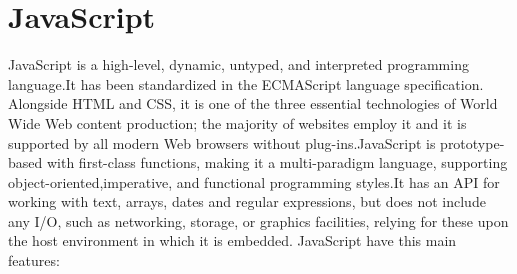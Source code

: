 \documentclass[a4paper, 12pt]{book}
\begin{document}
\section{JavaScript}
\label{sec:js}
JavaScript is a high-level, dynamic, untyped, and interpreted programming language.It has been standardized in the ECMAScript language specification. Alongside HTML and CSS, it is one of the three essential technologies of World Wide Web content production; the majority of websites employ it and it is supported by all modern Web browsers without plug-ins.JavaScript is prototype-based with first-class functions, making it a multi-paradigm language, supporting object-oriented,imperative, and functional programming styles.It has an API for working with text, arrays, dates and regular expressions, but does not include any I/O, such as networking, storage, or graphics facilities, relying for these upon the host environment in which it is embedded. JavaScript have this main features:
\end{document}

